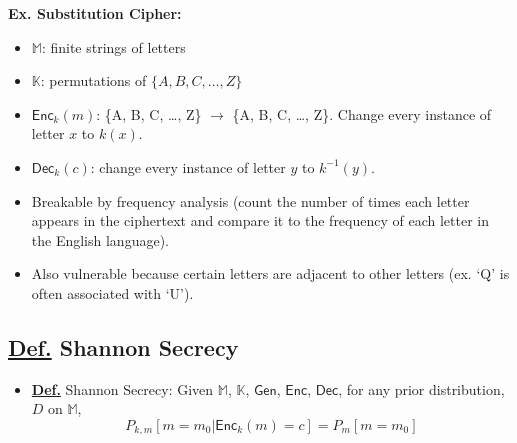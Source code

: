 \documentclass[11pt]{article}
\newcommand{\defn}{\underline{\textbf{Def.}} }
\newcommand{\Gen}{\textsf{Gen}}
\newcommand{\Enc}{\textsf{Enc}}
\newcommand{\Dec}{\textsf{Dec}}
\begin{document}
\noindent \textbf{Ex. Substitution Cipher:}
\begin{itemize}
    \item \(\mathbb{M}\): finite strings of letters
    \item \(\mathbb{K}\): permutations of \(\{A, B, C, \ldots, Z\}\)
    \item \(\Enc_k(m)\): \{A, B, C, \ldots, Z\} \(\rightarrow\) \{A, B, C, \ldots, Z\}. Change every instance of letter \(x\) to \(k(x)\).
    \item \(\Dec_k(c)\): change every instance of letter \(y\) to \(k^{-1}(y)\).
    \item Breakable by frequency analysis (count the number of times each letter appears in the ciphertext and compare it to the frequency of each letter in the English language).
    \item Also vulnerable because certain letters are adjacent to other letters (ex. `Q' is often associated with `U').
\end{itemize}

\subsection{\defn Shannon Secrecy}
\begin{itemize}
    \item \defn Shannon Secrecy: Given \(\mathbb{M}\), \(\mathbb{K}\), \(\Gen\), \(\Enc\), \(\Dec\), for any prior distribution, \(D\) on \(\mathbb{M}\),
    \[
        P_{k,m}[m = m_0 | \Enc_k(m) = c] = P_m[m=m_0]
    \]
\end{itemize}
\end{document}
